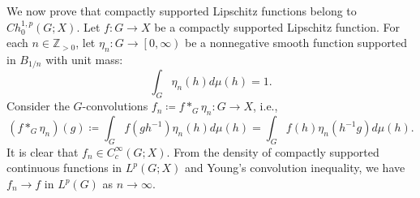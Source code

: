 \documentclass[11pt,reqno]{amsart}
\newcommand{\1}{\mathbf 1}
\begin{document}
We now prove that compactly supported Lipschitz functions belong to $Ch_0^{1,p}\left(G;X\right)$. Let $f:G\to X$ be a compactly supported Lipschitz function. For each $n\in \mathbb{Z}_{>0}$, let $\eta_n:G\to \left[0,\infty\right)$ be a nonnegative smooth function supported in $B_{1/n}$ with unit mass:
\begin{equation}\label{eq:etan-unitmass}
    \int_G \eta_n\left(h\right)d\mu\left(h\right)=1.
\end{equation}
Consider the $G$-convolutions $f_n\coloneqq f*_G\eta_n:G\to X$, i.e.,
\begin{equation}\label{eq:fn-convolution}
\left(f*_G\eta_n\right)\left(g\right)\coloneqq\int_Gf\left(gh^{-1}\right)\eta_n\left(h\right)d\mu\left(h\right)=\int_Gf\left(h\right)\eta_n\left(h^{-1}g\right)d\mu\left(h\right).
\end{equation}
It is clear that $f_n\in C_c^\infty\left(G;X\right)$. From the density of compactly supported continuous functions in $L^{p}\left(G;X\right)$ and Young's convolution inequality, we have $f_n\to f$ in $L^p\left(G\right)$ as $n\to \infty$.
\end{document}
